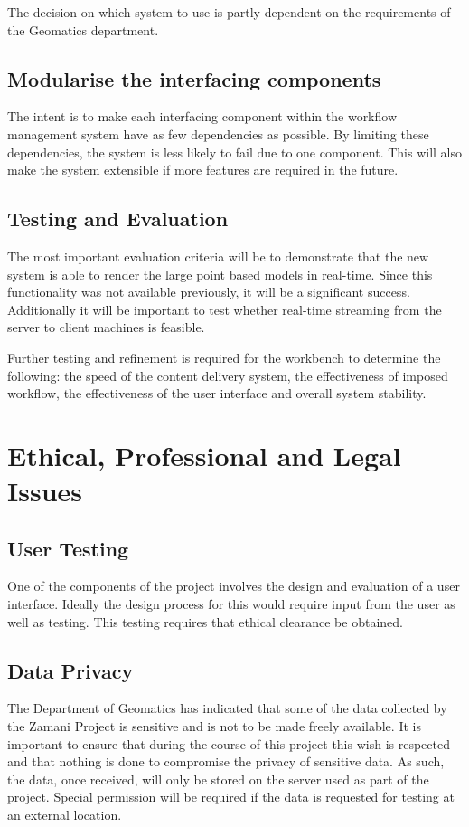 \documentclass[12pt,a4paper]{article}
\begin{document}
The decision on which system to use is partly dependent on the requirements
of the Geomatics department.
\subsection{Modularise the interfacing components}
The intent is to make each interfacing component within the workflow management system
have as few dependencies as possible. By limiting these dependencies,
the system is less likely to fail due to one component. This will also make
the system extensible if more features are required in the future.

\subsection{Testing and Evaluation}
The most important evaluation criteria will be to demonstrate that the new
system is able to render the large point based models in real-time. Since this
functionality was not available previously, it will be a significant success.
Additionally it will be important to test whether real-time streaming from the
server to client machines is feasible.

Further testing and refinement is required for the workbench
to determine the  following: the speed of the content
delivery system, the effectiveness of imposed workflow, the
effectiveness of the user interface and overall system stability. 

\section{Ethical, Professional and Legal Issues}
\subsection{User Testing}
One of the components of the project involves the design and evaluation
of a user interface. Ideally the design process for this would require
input from the user as well as testing. This testing requires that ethical clearance
be obtained.
\subsection{Data Privacy}
The Department of Geomatics has indicated that some of the data collected by
the Zamani Project is sensitive and is not to be made freely available. It is
important to ensure that during the course of this project this wish is respected
and that nothing is done to compromise the privacy of sensitive data. As such, the
data, once received, will only be stored on the server used as part of the project.
Special permission will be required if the data is requested for testing at an
external location.
\end{document}
